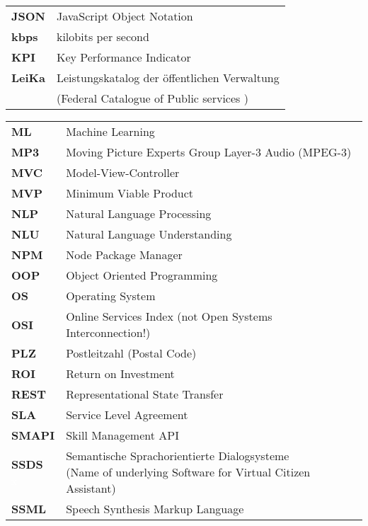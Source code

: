 \begin{flushleft}
\begin{tabular}{ll}
\textbf{JSON}	&	JavaScript Object Notation\\

\textbf{kbps}	&	kilobits per second\\

\textbf{KPI}	&	Key Performance Indicator\\

\textbf{LeiKa}	&	Leistungskatalog der öffentlichen Verwaltung \\
& (Federal Catalogue of Public %
services )\\


\end{tabular}
\begin{tabular}{ll}


\textbf{ML}		&	Machine Learning\\
\textbf{MP3}	&	Moving Picture Experts Group Layer-3 Audio (MPEG-3)\\
\textbf{MVC}	&	Model-View-Controller\\
\textbf{MVP}	&	Minimum Viable Product\\



\textbf{NLP}	&	Natural Language Processing\\
\textbf{NLU}	&	Natural Language Understanding\\
\textbf{NPM}	&	Node Package Manager\\

\textbf{OOP}		&	Object Oriented Programming\\
\textbf{OS}		&	Operating System\\
\textbf{OSI}	&	Online Services Index (not Open Systems Interconnection!)\\
\textbf{PLZ}	&	Postleitzahl (Postal Code)\\

\textbf{ROI}	&	Return on Investment\\
\textbf{REST}	&	Representational State Transfer\\
\textbf{SLA}	&	Service Level Agreement\\
\textbf{SMAPI}	&	Skill Management API\\


\shortstack[l]{\textbf{SSDS}\\ \textcolor{white}{x}}	&	\shortstack[l]{Semantische Sprachorientierte Dialogsysteme \\ (Name of underlying Software for Virtual Citizen Assistant)} \\
\textbf{SSML}	&	Speech Synthesis Markup Language\\


\end{tabular}
\end{flushleft}
